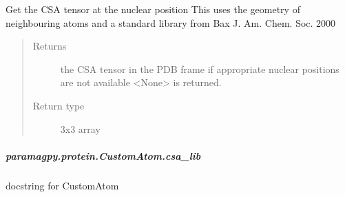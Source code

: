 \documentclass[a4paper,10pt,english,openany,oneside]{sphinxmanual}
\begin{document}
\begin{fulllineitems}
\begin{fulllineitems}
\begin{fulllineitems}
\label{\detokenize{reference/generated/paramagpy.protein.CustomAtom.csa:paramagpy.protein.CustomAtom.csa}}
\sphinxAtStartPar
Get the CSA tensor at the nuclear position
This uses the geometry of neighbouring atoms
and a standard library from Bax J. Am. Chem. Soc. 2000
\begin{quote}\begin{description}
\item[{Returns}] \leavevmode
\sphinxAtStartPar
{} \textendash{} the CSA tensor in the PDB frame
if appropriate nuclear positions are not
available \textless{}None\textgreater{} is returned.

\item[{Return type}] \leavevmode
\sphinxAtStartPar
3x3 array

\end{description}\end{quote}

\end{fulllineitems}



\subparagraph{paramagpy.protein.CustomAtom.csa\_lib}
\label{\detokenize{reference/generated/paramagpy.protein.CustomAtom.csa_lib:paramagpy-protein-customatom-csa-lib}}\label{\detokenize{reference/generated/paramagpy.protein.CustomAtom.csa_lib::doc}}

\begin{fulllineitems}
\label{\detokenize{reference/generated/paramagpy.protein.CustomAtom.csa_lib:paramagpy.protein.CustomAtom.csa_lib}}
\sphinxAtStartPar
docstring for CustomAtom


\end{fulllineitems}
\end{fulllineitems}
\end{fulllineitems}
\end{document}
